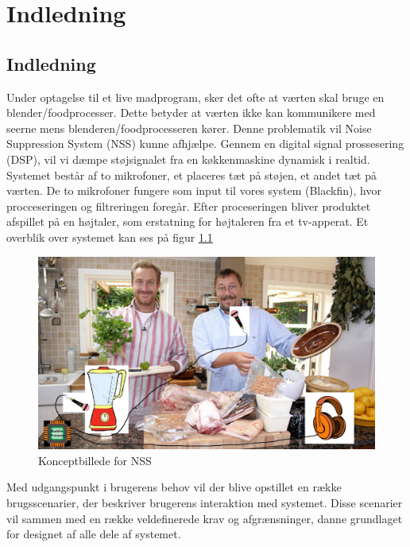 \graphicspath{{Chapters/Indledning/}}

\chapter{Indledning}
\section{Indledning}
Under optagelse til et live madprogram, sker det ofte at værten skal bruge en blender/foodprocesser. Dette betyder at værten ikke kan kommunikere med seerne mens blenderen/foodprocesseren kører. Denne problematik vil Noise Suppression System (NSS) kunne afhjælpe. Gennem en digital signal prossesering (DSP), vil vi dæmpe støjsignalet fra en køkkenmaskine dynamisk i realtid. Systemet består af to mikrofoner, et placeres tæt på støjen, et andet tæt på værten. De to mikrofoner fungere som input til vores system (Blackfin), hvor procceseringen og filtreringen foregår. Efter proceseringen bliver produktet afspillet på en højtaler, som erstatning for højtaleren fra et tv-apperat. Et overblik over systemet kan ses på figur \ref{fig:konceptbillede}

\begin{figure}[H]
	\centering
	\includegraphics[width = 400pt]{Img/Konceptbillede}
	\caption{Konceptbillede for NSS}
	\label{fig:konceptbillede}
\end{figure}

Med udgangspunkt i brugerens behov vil der blive opstillet en række brugsscenarier, der beskriver brugerens interaktion med systemet. Disse scenarier vil sammen med en række veldefinerede krav og afgrænsninger, danne grundlaget for designet af alle dele af systemet.  \\ 

\newpage

